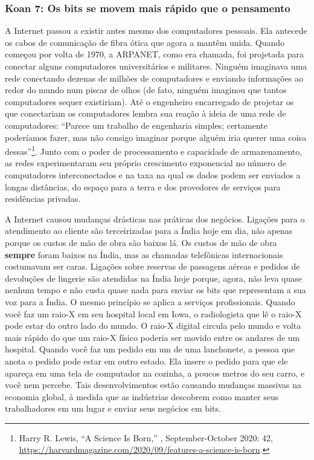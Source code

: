 \subsubsection*{Koan 7: Os bits se movem mais rápido que o pensamento}
\label{cap1:exp-dig-koans:7}
A Internet passou a existir antes mesmo dos computadores pessoais. Ela antecede
os cabos de comunicação de fibra ótica que agora a mantêm unida. Quando começou
por volta de 1970, a ARPANET, como era chamada, foi projetada para conectar
alguns computadores universitários e militares. Ninguém imaginava uma rede
conectando dezenas de milhões de computadores e enviando informações ao redor do
mundo num piscar de olhos (de fato, ninguém imaginou que tantos computadores
sequer existiriam). Até o engenheiro encarregado de projetar os
 que conectariam os computadores lembra sua reação à ideia de
uma rede de computadores: ``Parece um trabalho de engenharia simples; certamente
poderíamos fazer, mas não consigo imaginar porque alguém iria querer uma coisa
dessas''\footnote{Harry R. Lewis, ``A Science Is Born,'' , September-October 2020: 42,
\url{https://harvardmagazine.com/2020/09/features-a-science-is-born}.}. Junto
com o poder de processamento e capacidade de armazenamento, as redes
experimentaram seu próprio crescimento exponencial no número de computadores
interconectados e na taxa na qual os dados podem ser enviados a longas
distâncias, do espaço para a terra e dos provedores de serviços para residências
privadas.

A Internet causou mudanças drásticas nas práticas dos negócios. Ligações para o
atendimento ao cliente são terceirizadas para a Índia hoje em dia, não apenas
porque os custos de mão de obra são baixos lá. Os custos de mão de obra
\textbf{sempre} foram baixos na Índia, mas as chamadas telefônicas
internacionais costumavam ser caras. Ligações sobre reservas de passagens aéreas
e pedidos de devoluções de lingerie são atendidas na Índia hoje porque, agora,
não leva quase nenhum tempo e não custa quase nada para enviar os bits que
representam a sua voz para a Índia. O mesmo princípio se aplica a serviços
profissionais. Quando você faz um raio-X em seu hospital local em Iowa, o
radiologista que lê o raio-X pode estar do outro lado do mundo. O raio-X digital
circula pelo mundo e volta mais rápido do que um raio-X físico poderia ser
movido entre os andares de um hospital. Quando você faz um pedido em um
 de uma lanchonete, a pessoa que anota o pedido pode estar
em outro estado. Ela insere o pedido para que ele apareça em uma tela de
computador na cozinha, a poucos metros do seu carro, e você nem percebe. Tais
desenvolvimentos estão causando mudanças massivas na economia global, à medida
que as indústrias descobrem como manter seus trabalhadores em um lugar e enviar
seus negócios em bits.

